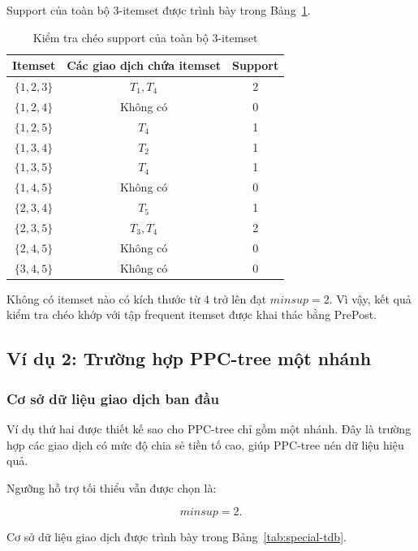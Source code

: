 Support của toàn bộ 3-itemset được trình bày trong Bảng~\ref{tab:basic-crosscheck-triples}.

\begin{table}[H]
\centering
\caption{Kiểm tra chéo support của toàn bộ 3-itemset}
\label{tab:basic-crosscheck-triples}
\begin{tabular}{ccc}
\toprule
Itemset & Các giao dịch chứa itemset & Support \\
\midrule
$\{1,2,3\}$ & $T_1,T_4$ & 2 \\
$\{1,2,4\}$ & Không có & 0 \\
$\{1,2,5\}$ & $T_4$ & 1 \\
$\{1,3,4\}$ & $T_2$ & 1 \\
$\{1,3,5\}$ & $T_4$ & 1 \\
$\{1,4,5\}$ & Không có & 0 \\
$\{2,3,4\}$ & $T_5$ & 1 \\
$\{2,3,5\}$ & $T_3,T_4$ & 2 \\
$\{2,4,5\}$ & Không có & 0 \\
$\{3,4,5\}$ & Không có & 0 \\
\bottomrule
\end{tabular}
\end{table}

Không có itemset nào có kích thước từ 4 trở lên đạt $\mathit{minsup}=2$. Vì vậy, kết quả kiểm tra chéo khớp với tập frequent itemset được khai thác bằng PrePost.

\subsection{Ví dụ 2: Trường hợp PPC-tree một nhánh}

\subsubsection{Cơ sở dữ liệu giao dịch ban đầu}

Ví dụ thứ hai được thiết kế sao cho PPC-tree chỉ gồm một nhánh. Đây là trường hợp các giao dịch có mức độ chia sẻ tiền tố cao, giúp PPC-tree nén dữ liệu hiệu quả.

Ngưỡng hỗ trợ tối thiểu vẫn được chọn là:

\begin{equation}
    \mathit{minsup}=2.
    \label{eq:chapter2-special-minsup}
\end{equation}

Cơ sở dữ liệu giao dịch được trình bày trong Bảng~\ref{tab:special-tdb}.


